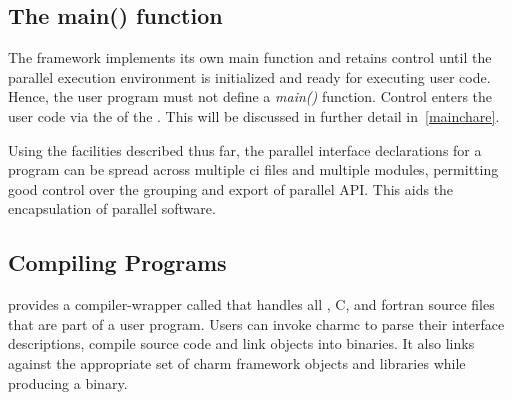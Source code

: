 \subsection{The main() function}

The \charmpp framework implements its own main\(\) function and retains control
until the parallel execution environment is initialized and ready for executing
user code. Hence, the user program must not define a \emph{main()} function.
Control enters the user code via the  of the .
This will be discussed in further detail in~\ref{mainchare}.

Using the facilities described thus far, the parallel interface declarations
for a \charm program can be spread across multiple ci files and multiple
modules, permitting good control over the grouping and export of parallel API.
This aids the encapsulation of parallel software.


\subsection{Compiling \charm Programs}

\charm provides a compiler-wrapper called  that handles all \ci, C,
\CC and fortran source files that are part of a user program. Users can invoke
charmc to parse their interface descriptions, compile source code and link
objects into binaries. It also links against the appropriate set of charm
framework objects and libraries while producing a binary.

